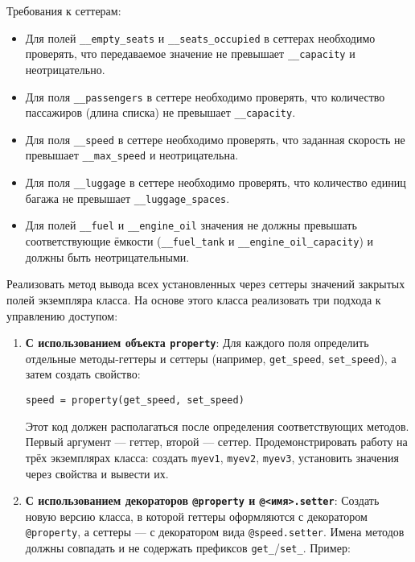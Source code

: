 \begin{enumerate}
\begin{itemize}
\end{itemize}
Требования к сеттерам:
\begin{itemize}
    \item Для полей \texttt{\_\_empty\_seats} и \texttt{\_\_seats\_occupied} в сеттерах необходимо проверять, что передаваемое значение не превышает \texttt{\_\_capacity} и неотрицательно.  
    \item Для поля \texttt{\_\_passengers} в сеттере необходимо проверять, что количество пассажиров (длина списка) не превышает \texttt{\_\_capacity}.  
    \item Для поля \texttt{\_\_speed} в сеттере необходимо проверять, что заданная скорость не превышает \texttt{\_\_max\_speed} и неотрицательна.  
    \item Для поля \texttt{\_\_luggage} в сеттере необходимо проверять, что количество единиц багажа не превышает \texttt{\_\_luggage\_spaces}.
    \item Для полей \texttt{\_\_fuel} и \texttt{\_\_engine\_oil} значения не должны превышать соответствующие ёмкости (\texttt{\_\_fuel\_tank} и \texttt{\_\_engine\_oil\_capacity}) и должны быть неотрицательными.
\end{itemize}
Реализовать метод вывода всех установленных через сеттеры значений закрытых полей экземпляра класса.
На основе этого класса реализовать три подхода к управлению доступом:
\begin{enumerate}
    \item \textbf{С использованием объекта \texttt{property}}:  
    Для каждого поля определить отдельные методы-геттеры и сеттеры (например, \texttt{get\_speed}, \texttt{set\_speed}), а затем создать свойство:  
    \begin{verbatim}
speed = property(get_speed, set_speed)
    \end{verbatim}  
    Этот код должен располагаться после определения соответствующих методов. Первый аргумент — геттер, второй — сеттер.  
    Продемонстрировать работу на трёх экземплярах класса: создать \texttt{myev1}, \texttt{myev2}, \texttt{myev3}, установить значения через свойства и вывести их.
    \item \textbf{С использованием декораторов \texttt{@property} и \texttt{@<имя>.setter}}:  
    Создать новую версию класса, в которой геттеры оформляются с декоратором \texttt{@property}, а сеттеры — с декоратором вида \texttt{@speed.setter}. Имена методов должны совпадать и не содержать префиксов \texttt{get\_}/\texttt{set\_}.  
    Пример:  
    \begin{verbatim}

\end{verbatim}
\end{enumerate}
\end{enumerate}
